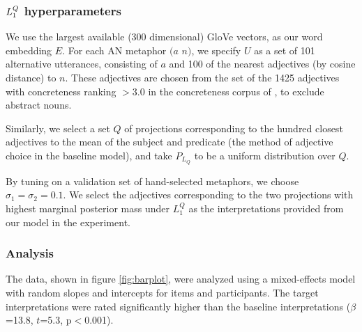 \documentclass[OpenMind]{stjour}
\newcommand{\Listener}{L}
\newcommand{\QLONE}{\Listener_{{1}}^{{Q}}}
\begin{document}



	\subsubsection{$\protect\QLONE$ hyperparameters}

		We use the largest available (300 dimensional) GloVe vectors, as our word embedding $E$. For each AN metaphor $(a$ $n)$, we specify $U$ as a set of 101 alternative utterances, consisting of $a$ and 100 of the nearest adjectives (by cosine distance) to $n$. These adjectives are chosen from the set of the 1425 adjectives with concreteness ranking $>3.0$ in the concreteness corpus of \citep{brysbaert2014concreteness}, to exclude abstract nouns.

		Similarly, we select a set $Q$ of projections corresponding to the hundred closest adjectives to the mean of the subject and predicate (the method of adjective choice in the baseline model), and take $P_{L_Q}$ to be a uniform distribution over $Q$. 

		By tuning on a validation set of hand-selected metaphors, we choose $\sigma_1=\sigma_2=0.1$. We select the adjectives corresponding to the two projections with highest marginal posterior mass under $\QLONE$ as the interpretations provided from our model in the experiment.

	\subsubsection{Analysis}

		The data, shown in figure \ref{fig:barplot}, were analyzed using a mixed-effects model with random slopes and intercepts for items and participants. The target interpretations were rated significantly higher than the baseline interpretations ($\beta$=13.8, $t$=5.3, p$<$0.001).


		

\end{document}
